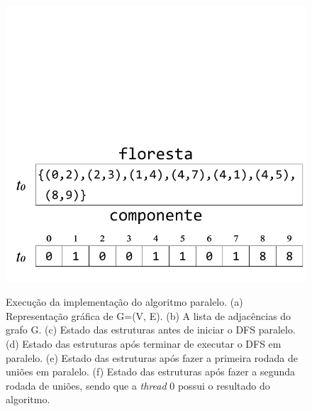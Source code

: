 \documentclass[12pt]{article}
\begin{document}
\begin{figure}[htp!]
{		\includegraphics[width=\linewidth]{figF.pdf}
	}
	\caption{Execução da implementação do algoritmo paralelo. (a) Representação gráfica de G=(V, E). (b) A lista de adjacências do grafo G. (c) Estado das estruturas antes de iniciar o DFS paralelo. (d) Estado das estruturas após terminar de executar o DFS em paralelo. (e) Estado das estruturas após fazer a primeira rodada de uniões em paralelo. (f) Estado das estruturas após fazer a segunda rodada de uniões, sendo que a \emph{thread} 0 possui o resultado do algoritmo.}
\end{figure}
\end{document}
